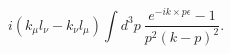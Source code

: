 \begin{equation}
    i (k_\mu l_\nu - k_\nu l_\mu)
    \int d^3 p~
    \frac{e^{-i k \times p \epsilon}-1}
         {p^2 (k-p)^2}.
\end{equation}

